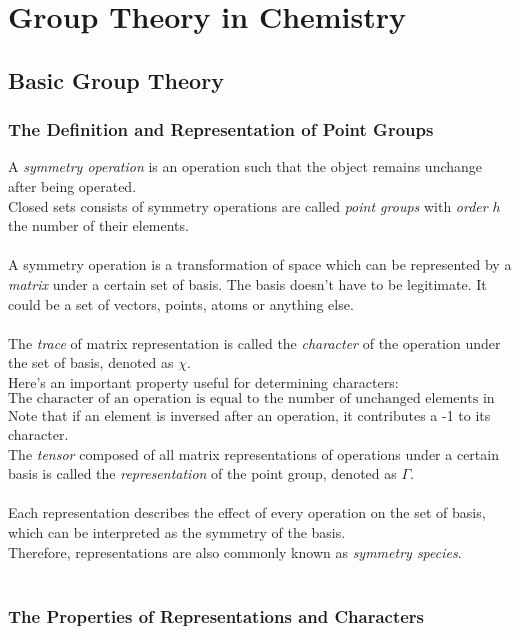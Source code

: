 \chapter{Group Theory in Chemistry}

\section{Basic Group Theory}

	\subsection{The Definition and Representation of Point Groups}

		A \emph{symmetry operation} is an operation such that the object remains unchange after being operated. \\
		Closed sets consists of symmetry operations are called \emph{point groups} with \emph{order} $h$ the number of their elements. \\\ \\
		A symmetry operation is a transformation of space which can be represented by a \emph{matrix} under a certain set of basis. 
		The basis doesn't have to be legitimate. It could be a set of vectors, points, atoms or anything else. \\\ \\
		The \emph{trace} of matrix representation is called the \emph{character} of the operation under the set of basis, 
			denoted as $\chi$. \\
		Here's an important property useful for determining characters:
		\[\boxed{\text{The character of an operation is equal to the number of unchanged elements in the basis set.}}\]\label{8.1.1}
		Note that if an element is inversed after an operation, it contributes a -1 to its character.\\
		The \emph{tensor} composed of all matrix representations of operations under a certain basis
			is called the \emph{representation} of the point group, denoted as $\Gamma$. \\\ \\
		Each representation describes the effect of every operation on the set of basis, which can be interpreted as the symmetry of the basis. \\
		Therefore, representations are also commonly known as \emph{symmetry species}.\\ \\
		
	\subsection{The Properties of Representations and Characters}\label{irrep}
	
